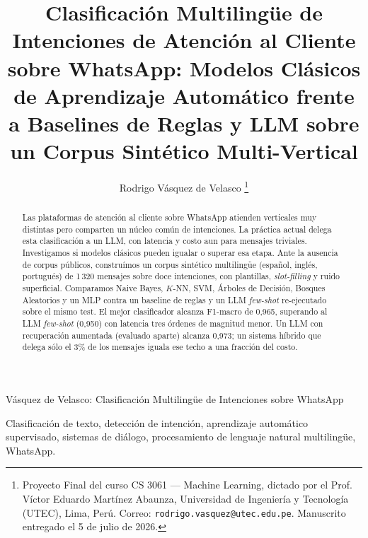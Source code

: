 \documentclass[journal]{IEEEtran}
\newcommand{\code}[1]{\texttt{\small #1}}
\begin{document}
\title{Clasificaci\'on Multiling\"ue de Intenciones de Atenci\'on al Cliente
sobre WhatsApp: Modelos Cl\'asicos de Aprendizaje Autom\'atico frente a
Baselines de Reglas y LLM sobre un Corpus Sint\'etico Multi-Vertical}

\author{Rodrigo V\'asquez de Velasco%
\thanks{Proyecto Final del curso CS 3061 --- Machine Learning, dictado por el
Prof. V\'ictor Eduardo Mart\'inez Abaunza, Universidad de Ingenier\'ia y
Tecnolog\'ia (UTEC), Lima, Per\'u. Correo: \code{rodrigo.vasquez@utec.edu.pe}.
Manuscrito entregado el 5 de julio de 2026.}}

%
{V\'asquez de Velasco: Clasificaci\'on Multiling\"ue de Intenciones sobre WhatsApp}

\maketitle

\begin{abstract}
Las plataformas de atenci\'on al cliente sobre WhatsApp atienden verticales muy
distintas pero comparten un n\'ucleo com\'un de intenciones. La pr\'actica actual
delega esta clasificaci\'on a un LLM, con latencia y costo aun para mensajes
triviales. Investigamos si modelos cl\'asicos pueden igualar o superar esa
etapa. Ante la ausencia de corpus p\'ublicos, constru\'imos un corpus
sint\'etico multiling\"ue (espa\~nol, ingl\'es, portugu\'es) de 1\,320 mensajes
sobre doce intenciones, con plantillas, \emph{slot-filling} y ruido superficial.
Comparamos Naive Bayes, $K$-NN, SVM, \'Arboles de Decisi\'on, Bosques
Aleatorios y un MLP contra un baseline de reglas y un LLM \emph{few-shot}
re-ejecutado sobre el mismo test. El mejor clasificador alcanza F1-macro de
0{,}965, superando al LLM \emph{few-shot} (0{,}950) con latencia tres \'ordenes
de magnitud menor. Un LLM con recuperaci\'on aumentada (evaluado aparte)
alcanza 0{,}973; un sistema h\'ibrido que delega s\'olo el 3\% de los mensajes
iguala ese techo a una fracci\'on del costo.
\end{abstract}

\begin{IEEEkeywords}
Clasificaci\'on de texto, detecci\'on de intenci\'on, aprendizaje autom\'atico
supervisado, sistemas de di\'alogo, procesamiento de lenguaje natural
multiling\"ue, WhatsApp.
\end{IEEEkeywords}
\end{document}
